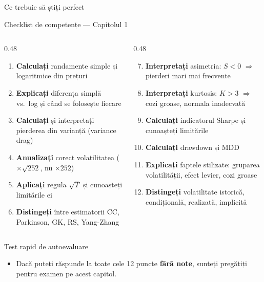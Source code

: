 \documentclass[9pt, aspectratio=169, t]{beamer}
\theoremstyle{definition}
\begin{document}
\begin{frame}[shrink=5]{Ce trebuie să știți perfect}
\begin{block}{Checklist de competențe --- Capitolul 1}
\begin{columns}[T]
\begin{column}{0.48\textwidth}
\begin{enumerate}
    \item[\checkmark] \textbf{Calculați} randamente simple și logaritmice din prețuri
    \item[\checkmark] \textbf{Explicați} diferența simplă vs.\ log și când se folosește fiecare
    \item[\checkmark] \textbf{Calculați} și interpretați pierderea din varianță (variance drag)
    \item[\checkmark] \textbf{Anualizați} corect volatilitatea ($\times\sqrt{252}$, nu $\times 252$)
    \item[\checkmark] \textbf{Aplicați} regula $\sqrt{T}$ și cunoașteți limitările ei
    \item[\checkmark] \textbf{Distingeți} între estimatorii CC, Parkinson, GK, RS, Yang-Zhang
\end{enumerate}
\end{column}
\begin{column}{0.48\textwidth}
\begin{enumerate}\setcounter{enumi}{6}
    \item[\checkmark] \textbf{Interpretați} asimetria: $S < 0$ $\Rightarrow$ pierderi mari mai frecvente
    \item[\checkmark] \textbf{Interpretați} kurtosis: $K > 3$ $\Rightarrow$ cozi groase, normala inadecvată
    \item[\checkmark] \textbf{Calculați} indicatorul Sharpe și cunoașteți limitările
    \item[\checkmark] \textbf{Calculați} drawdown și MDD
    \item[\checkmark] \textbf{Explicați} faptele stilizate: gruparea volatilității, efect levier, cozi groase
    \item[\checkmark] \textbf{Distingeți} volatilitate istorică, condițională, realizată, implicită
\end{enumerate}
\end{column}
\end{columns}
\end{block}
\vspace{0.1cm}
\begin{exampleblock}{Test rapid de autoevaluare}
\begin{itemize}\setlength{\itemsep}{0pt}
    \item Dacă puteți răspunde la toate cele 12 puncte \textbf{fără note}, sunteți pregătiți pentru examen pe acest capitol.
\end{itemize}
\end{exampleblock}
\end{frame}
\end{document}
